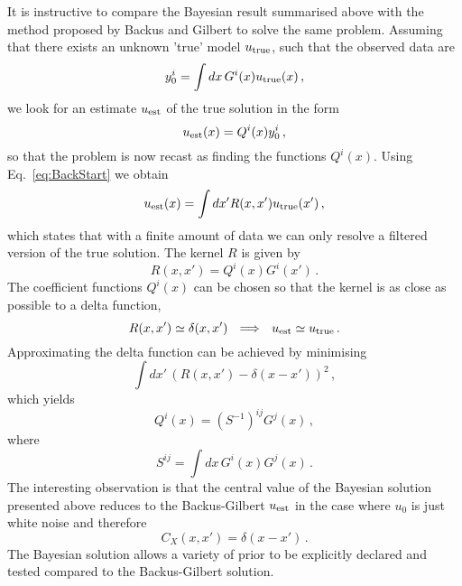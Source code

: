 It is instructive to compare the Bayesian result summarised above with the
method proposed by Backus and Gilbert to solve the same problem. Assuming that
there exists an unknown 'true' model $u_\mathrm{true}$, such that the observed data are
\begin{equation}
  \label{eq:BackStart}
  y_0^i = \int dx\, G^i(x) u_\mathrm{true}(x)\, ,
\end{equation}
we look for an estimate $u_\mathrm{est}$ of the true solution in the form
\begin{equation}
  \label{eq:BackAnsatz}
  u_\mathrm{est}(x) = Q^i(x) y^i_0\, ,
\end{equation}
so that the problem is now recast as finding the functions $Q^i(x)$.
Using Eq.~\ref{eq:BackStart} we obtain
\begin{equation}
  \label{eq:BackFilter}
  u_\mathrm{est}(x) = \int dx' R(x,x') u_\mathrm{true}(x')\, , 
\end{equation}
which states that with a finite amount of data we can only resolve a filtered
version of the true solution. The kernel $R$ is given by
\begin{equation}
  \label{eq:BackKernel}
  R(x,x') = Q^i(x) G^i(x')\, .
\end{equation}
The coefficient functions $Q^i(x)$ can be chosen so that the kernel is as close as possible
to a delta function,
\begin{equation}
  \label{eq:BackDelta}
  R(x,x') \simeq \delta(x,x') ~~ \Longrightarrow ~~
  u_\mathrm{est} \simeq u_\mathrm{true}\, .
\end{equation}
Approximating the delta function can be achieved by minimising 
\begin{equation}
  \label{eq:BackDeltaness}
  \int dx'\, \left(
    R(x,x') - \delta(x-x')
  \right)^2\, ,
\end{equation}
which yields
\begin{equation}
  \label{eq:BackSolution}
  Q^i(x) = \left(S^{-1}\right)^{ij} G^j(x)\, ,
\end{equation}
where 
\begin{equation}
  \label{eq:BackSMatrix}
  S^{ij} = \int dx\, G^i(x) G^j(x)\, .
\end{equation}
The interesting observation is that the central value of the Bayesian solution
presented above reduces to the Backus-Gilbert $u_\mathrm{est}$ in the case where $u_0$ 
is just white noise and therefore
\begin{equation}
  \label{eq:BackComparison}
  C_{X}(x,x') = \delta(x-x')\, .
\end{equation}
The Bayesian solution allows a variety of prior to be explicitly declared and
tested compared to the Backus-Gilbert solution. 